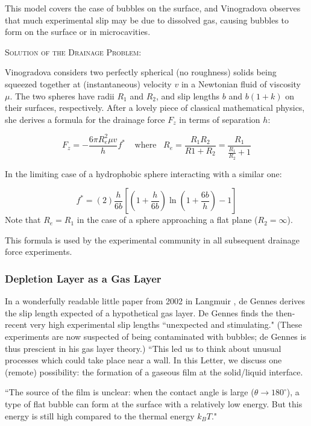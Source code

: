 \documentclass[12pt, a4paper, twoside, openright]{book}
\newcommand{\paper}[1]
         {\colorbox[gray]{0.8}{ \textsc{#1}}
         
         }
\begin{document}
This model covers the case of bubbles on the surface, and Vinogradova observes that much experimental slip may be due to dissolved gas, causing bubbles to form on the surface or in microcavities.

\clearpage
\paper{Solution of the Drainage Problem:}
Vinogradova considers two perfectly spherical (no roughness) solids being squeezed together at (instantaneous) velocity $v$ in a Newtonian fluid of viscosity $\mu$. The two spheres have radii $R_{1}$ and $R_{2}$, and slip lengths $b$ and $b(1+k)$ on their surfaces, respectively. After a lovely piece of classical mathematical physics, she derives a formula for the drainage force
$F_{z}$ in terms of separation $h$:

\begin{equation}
F_{z} = - \frac{6 \pi R_{e}^{2} \mu v}{h} f^{*}
 \;\;\;\; \mathrm{where}\;\;\;R_{e} = \frac{R_{1}R_{2}}{R{1}+R_{2}} = 
 \frac{R_{1}}{\frac{R_{1}}{R_{2}} + 1}
\end{equation} 

 In the limiting case of a hydrophobic sphere interacting with a similar one:
 
\begin{equation}
f^{*} = (2)\frac{h}{6b} \left[ \left(1 + \frac{h}{6b} \right)
 \ln \left(1 + \frac{6b}{h} \right) - 1 \right]
\end{equation}
Note that $R_{e} = R_{1}$ in the case of a sphere approaching a flat plane ($R_{2}=\infty$).

This formula is used by the experimental community in all subsequent drainage force experiments.

\subsubsection*{Depletion Layer as a Gas Layer}

In a wonderfully readable little paper from 2002 in Langmuir \cite{deGennes2002}, de Gennes derives the slip length expected of a hypothetical gas layer.  De Gennes finds the then-recent very high experimental slip lengths ``unexpected and stimulating."  (These experiments are now suspected of being contaminated with bubbles; de Gennes is thus prescient in his gas layer theory.) ``This led us to think about unusual processes which could take place near a wall.  In this Letter, we discuss one (remote) possibility: the formation of a gaseous film at the solid/liquid interface.

``The source of the film is unclear: when the contact angle is large ($\theta \rightarrow 180^{\circ}$), a type of flat bubble can form at the surface with a relatively low energy.  But this energy is still high compared to the thermal energy $k_{B} T$."
\end{document}
